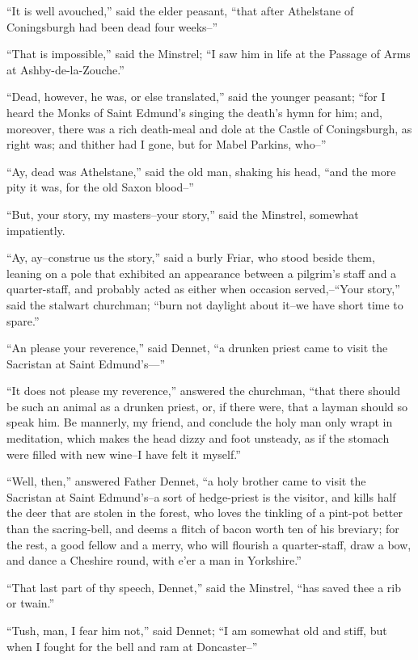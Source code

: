 ``It is well avouched,'' said the elder peasant, ``that after Athelstane
of Coningsburgh had been dead four weeks--''

``That is impossible,'' said the Minstrel; ``I saw him in life at the
Passage of Arms at Ashby-de-la-Zouche.''

``Dead, however, he was, or else translated,'' said the younger peasant;
``for I heard the Monks of Saint Edmund's singing the death's hymn for
him; and, moreover, there was a rich death-meal and dole at the Castle
of Coningsburgh, as right was; and thither had I gone, but for Mabel
Parkins, who--''

``Ay, dead was Athelstane,'' said the old man, shaking his head, ``and
the more pity it was, for the old Saxon blood--''

``But, your story, my masters--your story,'' said the Minstrel, somewhat
impatiently.

``Ay, ay--construe us the story,'' said a burly Friar, who stood beside
them, leaning on a pole that exhibited an appearance between a pilgrim's
staff and a quarter-staff, and probably acted as either when occasion
served,--``Your story,'' said the stalwart churchman; ``burn not
daylight about it--we have short time to spare.''

``An please your reverence,'' said Dennet, ``a drunken priest came to
visit the Sacristan at Saint Edmund's---''

``It does not please my reverence,'' answered the churchman, ``that
there should be such an animal as a drunken priest, or, if there were,
that a layman should so speak him. Be mannerly, my friend, and conclude
the holy man only wrapt in meditation, which makes the head dizzy and
foot unsteady, as if the stomach were filled with new wine--I have felt
it myself.''

``Well, then,'' answered Father Dennet, ``a holy brother came to visit
the Sacristan at Saint Edmund's--a sort of hedge-priest is the visitor,
and kills half the deer that are stolen in the forest, who loves the
tinkling of a pint-pot better than the sacring-bell, and deems a flitch
of bacon worth ten of his breviary; for the rest, a good fellow and a
merry, who will flourish a quarter-staff, draw a bow, and dance a
Cheshire round, with e'er a man in Yorkshire.''

``That last part of thy speech, Dennet,'' said the Minstrel, ``has saved
thee a rib or twain.''

``Tush, man, I fear him not,'' said Dennet; ``I am somewhat old and
stiff, but when I fought for the bell and ram at Doncaster--''


